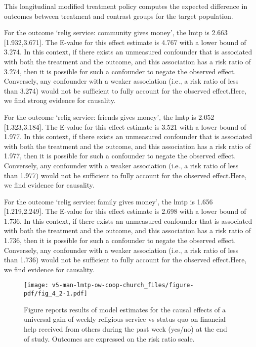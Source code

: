 \documentclass[
  singlecolumn]{article}
\begin{document}
This longitudinal modified treatment policy computes the expected
difference in outcomes between treatment and contrast groups for the
target population.

For the outcome `relig service: community gives money', the lmtp is
2.663 {[}1.932,3.671{]}. The E-value for this effect estimate is 4.767
with a lower bound of 3.274. In this context, if there exists an
unmeasured confounder that is associated with both the treatment and the
outcome, and this association has a risk ratio of 3.274, then it is
possible for such a confounder to negate the observed effect.
Conversely, any confounder with a weaker association (i.e., a risk ratio
of less than 3.274) would not be sufficient to fully account for the
observed effect.Here, we find strong evidence for causality.

For the outcome `relig service: friends gives money', the lmtp is 2.052
{[}1.323,3.184{]}. The E-value for this effect estimate is 3.521 with a
lower bound of 1.977. In this context, if there exists an unmeasured
confounder that is associated with both the treatment and the outcome,
and this association has a risk ratio of 1.977, then it is possible for
such a confounder to negate the observed effect. Conversely, any
confounder with a weaker association (i.e., a risk ratio of less than
1.977) would not be sufficient to fully account for the observed
effect.Here, we find evidence for causality.

For the outcome `relig service: family gives money', the lmtp is 1.656
{[}1.219,2.249{]}. The E-value for this effect estimate is 2.698 with a
lower bound of 1.736. In this context, if there exists an unmeasured
confounder that is associated with both the treatment and the outcome,
and this association has a risk ratio of 1.736, then it is possible for
such a confounder to negate the observed effect. Conversely, any
confounder with a weaker association (i.e., a risk ratio of less than
1.736) would not be sufficient to fully account for the observed
effect.Here, we find evidence for causality.

\newpage{}

\begin{figure}[H]

{\centering \texttt{[image: v5-man-lmtp-ow-coop-church\_files/figure-pdf/fig\_4\_2-1.pdf]}

}

\caption{Figure reports results of model estimates for the causal
effects of a universal gain of weekly religious service vs status quo on
financial help received from others during the past week (yes/no) at the
end of study. Outcomes are expressed on the risk ratio scale.}

\end{figure}%
\end{document}
